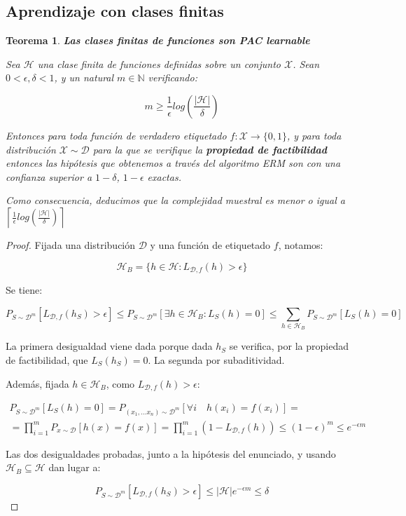 \documentclass[11pt]{article}
\newtheorem{theorem}{Teorema}
\begin{document}
\subsection{Aprendizaje con clases finitas}
\label{sec-2-1}

\begin{theorem}
\textbf{Las clases finitas de funciones son PAC learnable}

Sea $\mathcal{H}$ una clase finita de funciones definidas sobre un conjunto $\mathcal{X}$. Sean $0 < \epsilon, \delta < 1$, y un natural $m\in \mathbb{N}$ verificando:

\[m \ge \frac{1}{\epsilon}log\left(\frac{|\mathcal{H}|}{\delta}\right)\]

Entonces para toda función de verdadero etiquetado $f: \mathcal{X}\rightarrow \{0,1\}$, y para toda distribución $\mathcal{X}\sim \mathcal{D}$ para la que se verifique la \textbf{propiedad de factibilidad} entonces las hipótesis que obtenemos a través del algoritmo ERM son con una confianza superior a $1-\delta$, $1-\epsilon$ exactas.

Como consecuencia, deducimos que la complejidad muestral es menor o igual a $\left\lceil \frac{1}{\epsilon}log \left(\frac{|\mathcal{H}|}{\delta} \right) \right\rceil$
\end{theorem}

\begin{proof}
Fijada una distribución $\mathcal{D}$ y una función de etiquetado $f$, notamos:

\[\mathcal{H}_B = \{h\in \mathcal{H}: L_{\mathcal{D},f}(h) > \epsilon\}\]

Se tiene:

\[P_{S\sim \mathcal{D}^m}[L_{\mathcal{D},f}(h_S) > \epsilon] \le  P_{S\sim \mathcal{D}^m}[\exists h\in \mathcal{H}_B : L_S(h) = 0] \le \sum_{h\in \mathcal{H}_B} P_{S\sim \mathcal{D}^m}[L_S(h) = 0] \]

La primera desigualdad viene dada porque dada $h_S$ se verifica, por la propiedad de factibilidad, que $L_S(h_S)=0$. La segunda por subaditividad.

Además, fijada $h\in \mathcal{H}_B$, como $L_{\mathcal{D},f}(h) > \epsilon$:

\begin{align*}
P_{S\sim \mathcal{D}^m}[L_S(h) = 0] = P_{(x_1, \ldots x_n)\sim \mathcal{D}^m} [\forall i \quad h(x_i) = f(x_i)] =\\
= \prod_{i=1}^m P_{x\sim \mathcal{D}}[h(x)=f(x)] = \prod_{i=1}^m (1 - L_{\mathcal{D},f}(h)) \le (1-\epsilon)^m \le e^{-\epsilon m}
\end{align*}


Las dos desigualdades probadas, junto a la hipótesis del enunciado, y usando $\mathcal{H}_B \subseteq \mathcal{H}$ dan lugar a:

\[P_{S\sim \mathcal{D}^m}[L_{\mathcal{D},f}(h_S) > \epsilon] \le |\mathcal{H}|e^{-\epsilon m} \le \delta\]
\end{proof}
\end{document}
